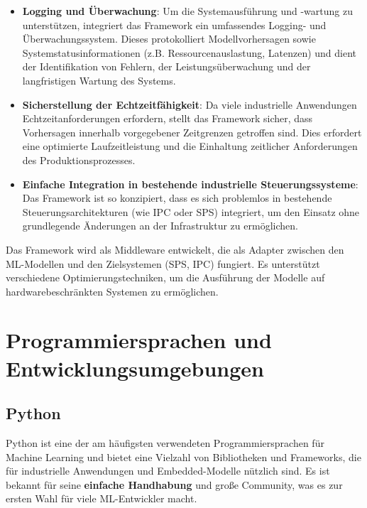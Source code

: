 \begin{itemize}
    \item \textbf{Logging und Überwachung}: Um die Systemausführung und -wartung zu unterstützen, integriert das Framework ein umfassendes Logging- und Überwachungssystem. 
    Dieses protokolliert Modellvorhersagen sowie Systemstatusinformationen (z.B. Ressourcenauslastung, Latenzen) und dient der Identifikation von Fehlern, der 
    Leistungsüberwachung und der langfristigen Wartung des Systems.
  
    \item \textbf{Sicherstellung der Echtzeitfähigkeit}: Da viele industrielle Anwendungen Echtzeitanforderungen erfordern, stellt das Framework sicher, dass 
    Vorhersagen innerhalb vorgegebener Zeitgrenzen getroffen sind. Dies erfordert eine optimierte Laufzeitleistung und die Einhaltung zeitlicher Anforderungen des Produktionsprozesses.
   
    \item \textbf{Einfache Integration in bestehende industrielle Steuerungssysteme}: Das Framework ist so konzipiert, dass es sich problemlos in bestehende Steuerungsarchitekturen 
    (wie IPC oder SPS) integriert, um den Einsatz ohne grundlegende Änderungen an der Infrastruktur zu ermöglichen.
\end{itemize}

Das Framework wird als Middleware entwickelt, die als Adapter zwischen den ML-Modellen und den Zielsystemen (SPS, IPC) fungiert. Es unterstützt verschiedene Optimierungstechniken, 
um die Ausführung der Modelle auf hardwarebeschränkten Systemen zu ermöglichen.

\section{Programmiersprachen und Entwicklungsumgebungen}

\subsection{Python}
Python ist eine der am häufigsten verwendeten Programmiersprachen für Machine Learning \cite{info11040193} und bietet eine Vielzahl von Bibliotheken und Frameworks, 
die für industrielle Anwendungen und Embedded-Modelle nützlich sind. Es ist bekannt für seine \textbf{einfache Handhabung} und große Community, 
was es zur ersten Wahl für viele ML-Entwickler macht.

